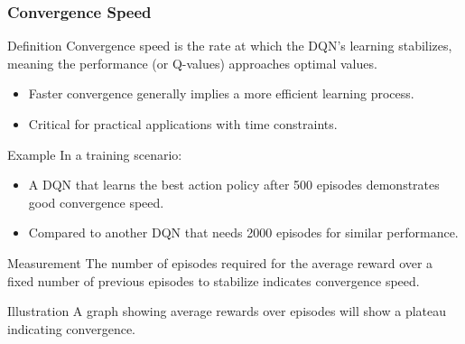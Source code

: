 \documentclass[aspectratio=169]{beamer}
\begin{document}
\begin{frame}[fragile]
    \frametitle{Convergence Speed}
    \begin{block}{Definition}
        Convergence speed is the rate at which the DQN's learning stabilizes, meaning the performance (or Q-values) approaches optimal values.
    \end{block}
    
    \begin{itemize}
        \item Faster convergence generally implies a more efficient learning process.
        \item Critical for practical applications with time constraints.
    \end{itemize}

    \begin{block}{Example}
        In a training scenario:
        \begin{itemize}
            \item A DQN that learns the best action policy after 500 episodes demonstrates good convergence speed.
            \item Compared to another DQN that needs 2000 episodes for similar performance.
        \end{itemize}
    \end{block}
    
    \begin{block}{Measurement}
        The number of episodes required for the average reward over a fixed number of previous episodes to stabilize indicates convergence speed.
    \end{block}

    \begin{block}{Illustration}
        A graph showing average rewards over episodes will show a plateau indicating convergence.
    \end{block}
\end{frame}
\end{document}
